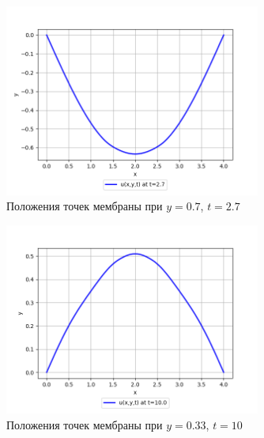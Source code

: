 {{\begin{figure}[H]
    \centering                             
	\includegraphics[width=0.75\textwidth,height=\textheight,keepaspectratio]{04_07_27.png}                 
	\caption{ Положения точек мембраны при $y=0.7$, $t=2.7$}
	\label{grapics3}                           
\end{figure}              
\begin{figure}[H]
    \centering                             
	\includegraphics[width=0.75\textwidth,height=\textheight,keepaspectratio]{01_033_100.png}                 
	\caption{ Положения точек мембраны при $y=0.33$, $t=10$}
	\label{grapics4}                           
\end{figure}                       

%

}}
